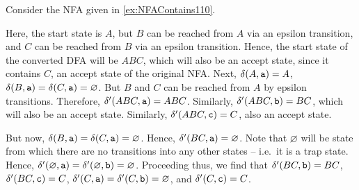 \begin{Example}
Consider the NFA given in \cref{ex:NFAContains110}.
\begin{center}
\end{center}
Here, the start state is $A$, but $B$ can be reached from $A$ via an epsilon transition, and $C$ can be reached from $B$ via an epsilon transition. Hence, the start state of the converted DFA will be $ABC$, which will also be an accept state, since it contains $C$, an accept state of the original NFA. Next, $\delta(A, \ta) = A$, $\delta(B, \ta) = \delta(C, \ta) = \varnothing$. But $B$ and $C$ can be reached from $A$ by epsilon transitions. Therefore, $\delta'(ABC, \ta) = ABC$. Similarly, $\delta'(ABC, \tb) = BC$, which will also be an accept state. Similarly, $\delta'(ABC, \tc) = C$, also an accept state.
\begin{center}
\end{center}
But now, $\delta(B, \ta) = \delta(C, \ta) = \varnothing$. Hence, $\delta'(BC, \ta) = \varnothing$. Note that $\varnothing$ will be state from which there are no transitions into any other states -- i.e.\ it is a trap state. Hence, $\delta'(\varnothing, \ta) = \delta'(\varnothing, \tb) = \varnothing$. Proceeding thus, we find that $\delta'(BC, \tb) = BC$, $\delta'(BC, \tc) = C$, $\delta'(C, \ta) = \delta'(C, \tb) = \varnothing$, and $\delta'(C, \tc) = C$.
\begin{center}
\begin{tikzpicture}[> = stealth, shorten > = 1pt, node distance = 2cm, on grid, auto, initial text =]

\end{tikzpicture}
\end{center}
\end{Example}
